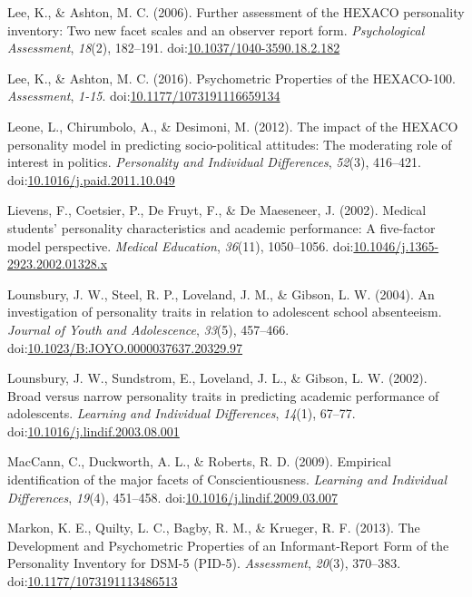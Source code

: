 \documentclass[,man,floatsintext]{apa6}
\begin{document}
\hypertarget{ref-Lee2006}{}
Lee, K., \& Ashton, M. C. (2006). Further assessment of the HEXACO
personality inventory: Two new facet scales and an observer report form.
\emph{Psychological Assessment}, \emph{18}(2), 182--191.
doi:\href{https://doi.org/10.1037/1040-3590.18.2.182}{10.1037/1040-3590.18.2.182}

\hypertarget{ref-Lee2016}{}
Lee, K., \& Ashton, M. C. (2016). Psychometric Properties of the
HEXACO-100. \emph{Assessment}, \emph{1-15}.
doi:\href{https://doi.org/10.1177/1073191116659134}{10.1177/1073191116659134}

\hypertarget{ref-Leone2012}{}
Leone, L., Chirumbolo, A., \& Desimoni, M. (2012). The impact of the
HEXACO personality model in predicting socio-political attitudes: The
moderating role of interest in politics. \emph{Personality and
Individual Differences}, \emph{52}(3), 416--421.
doi:\href{https://doi.org/10.1016/j.paid.2011.10.049}{10.1016/j.paid.2011.10.049}

\hypertarget{ref-Lievens2002}{}
Lievens, F., Coetsier, P., De Fruyt, F., \& De Maeseneer, J. (2002).
Medical students' personality characteristics and academic performance:
A five-factor model perspective. \emph{Medical Education},
\emph{36}(11), 1050--1056.
doi:\href{https://doi.org/10.1046/j.1365-2923.2002.01328.x}{10.1046/j.1365-2923.2002.01328.x}

\hypertarget{ref-Lounsbury2004}{}
Lounsbury, J. W., Steel, R. P., Loveland, J. M., \& Gibson, L. W.
(2004). An investigation of personality traits in relation to adolescent
school absenteeism. \emph{Journal of Youth and Adolescence},
\emph{33}(5), 457--466.
doi:\href{https://doi.org/10.1023/B:JOYO.0000037637.20329.97}{10.1023/B:JOYO.0000037637.20329.97}

\hypertarget{ref-Lounsbury2002}{}
Lounsbury, J. W., Sundstrom, E., Loveland, J. L., \& Gibson, L. W.
(2002). Broad versus narrow personality traits in predicting academic
performance of adolescents. \emph{Learning and Individual Differences},
\emph{14}(1), 67--77.
doi:\href{https://doi.org/10.1016/j.lindif.2003.08.001}{10.1016/j.lindif.2003.08.001}

\hypertarget{ref-MacCann2009}{}
MacCann, C., Duckworth, A. L., \& Roberts, R. D. (2009). Empirical
identification of the major facets of Conscientiousness. \emph{Learning
and Individual Differences}, \emph{19}(4), 451--458.
doi:\href{https://doi.org/10.1016/j.lindif.2009.03.007}{10.1016/j.lindif.2009.03.007}

\hypertarget{ref-Markon2013}{}
Markon, K. E., Quilty, L. C., Bagby, R. M., \& Krueger, R. F. (2013).
The Development and Psychometric Properties of an Informant-Report Form
of the Personality Inventory for DSM-5 (PID-5). \emph{Assessment},
\emph{20}(3), 370--383.
doi:\href{https://doi.org/10.1177/1073191113486513}{10.1177/1073191113486513}
\end{document}

